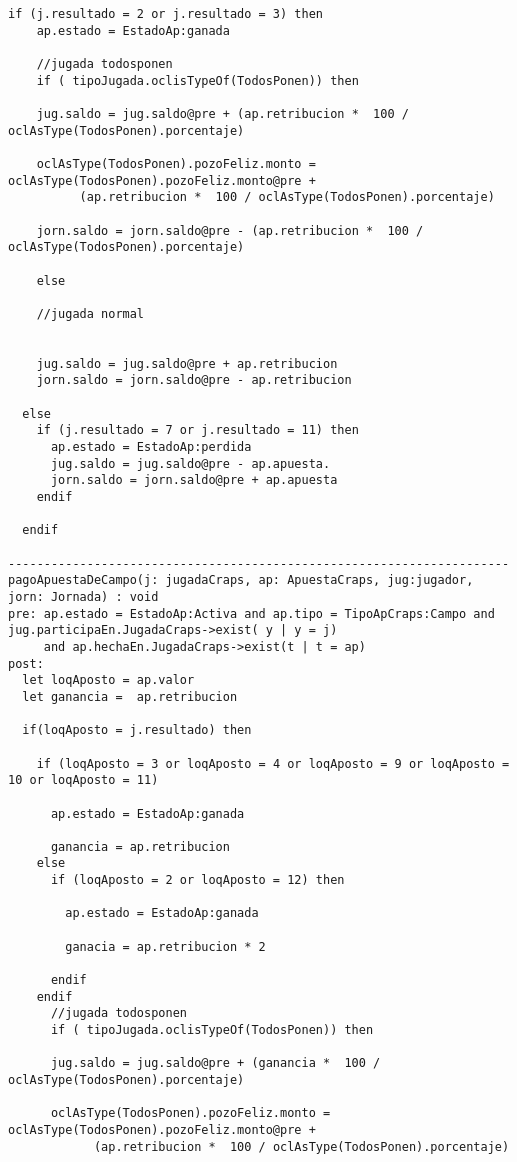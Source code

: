\begin{framed}
\begin{lstlisting}[breaklines=true]
  if (j.resultado = 2 or j.resultado = 3) then
    ap.estado = EstadoAp:ganada
    
    //jugada todosponen
    if ( tipoJugada.oclisTypeOf(TodosPonen)) then 
    
    jug.saldo = jug.saldo@pre + (ap.retribucion *  100 / oclAsType(TodosPonen).porcentaje)
    
    oclAsType(TodosPonen).pozoFeliz.monto = oclAsType(TodosPonen).pozoFeliz.monto@pre + 
          (ap.retribucion *  100 / oclAsType(TodosPonen).porcentaje)

    jorn.saldo = jorn.saldo@pre - (ap.retribucion *  100 / oclAsType(TodosPonen).porcentaje)

    else

    //jugada normal


    jug.saldo = jug.saldo@pre + ap.retribucion
    jorn.saldo = jorn.saldo@pre - ap.retribucion

  else 
    if (j.resultado = 7 or j.resultado = 11) then
      ap.estado = EstadoAp:perdida
      jug.saldo = jug.saldo@pre - ap.apuesta.
      jorn.saldo = jorn.saldo@pre + ap.apuesta
    endif
  
  endif

----------------------------------------------------------------------
pagoApuestaDeCampo(j: jugadaCraps, ap: ApuestaCraps, jug:jugador, jorn: Jornada) : void
pre: ap.estado = EstadoAp:Activa and ap.tipo = TipoApCraps:Campo and jug.participaEn.JugadaCraps->exist( y | y = j) 
     and ap.hechaEn.JugadaCraps->exist(t | t = ap)
post:
  let loqAposto = ap.valor
  let ganancia =  ap.retribucion

  if(loqAposto = j.resultado) then

    if (loqAposto = 3 or loqAposto = 4 or loqAposto = 9 or loqAposto = 10 or loqAposto = 11)

      ap.estado = EstadoAp:ganada
      
      ganancia = ap.retribucion
    else
      if (loqAposto = 2 or loqAposto = 12) then
      
        ap.estado = EstadoAp:ganada
        
        ganacia = ap.retribucion * 2
        
      endif
    endif
      //jugada todosponen
      if ( tipoJugada.oclisTypeOf(TodosPonen)) then 
    
      jug.saldo = jug.saldo@pre + (ganancia *  100 / oclAsType(TodosPonen).porcentaje)
    
      oclAsType(TodosPonen).pozoFeliz.monto = oclAsType(TodosPonen).pozoFeliz.monto@pre + 
            (ap.retribucion *  100 / oclAsType(TodosPonen).porcentaje)


\end{lstlisting}
\end{framed}
